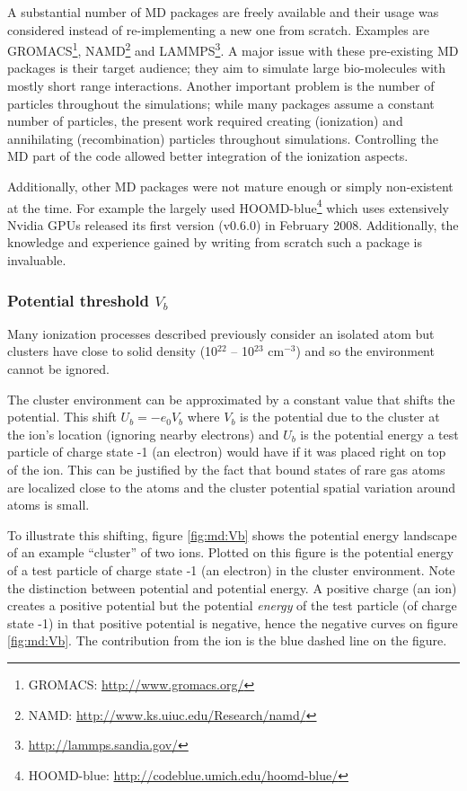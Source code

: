 A substantial number of MD packages are freely available and
their usage was considered instead of re-implementing a new one from scratch.
Examples are GROMACS\footnote{GROMACS:
\url{http://www.gromacs.org/}}, NAMD\footnote{NAMD:
\url{http://www.ks.uiuc.edu/Research/namd/}} and
LAMMPS\footnote{\url{http://lammps.sandia.gov/}}. A major issue with these
pre-existing MD packages is their target audience; they aim to simulate large
bio-molecules with mostly short range interactions. Another important problem
is the number of particles throughout the simulations; while many packages
assume a constant number of particles, the present work required creating
(ionization) and annihilating (recombination) particles throughout simulations.
Controlling the MD part of the code allowed better integration of the
ionization aspects.

Additionally, other MD packages were not mature enough or simply non-existent at the time.
For example the largely used HOOMD-blue\footnote{HOOMD-blue:
\url{http://codeblue.umich.edu/hoomd-blue/}} which uses extensively
Nvidia GPUs released its first version (v0.6.0) in February 2008.
Additionally, the knowledge and experience gained by writing from scratch such
a package is invaluable.






\subsubsection{Potential threshold $V_b$}
\label{section:intro:Vb}

Many ionization processes described previously consider an isolated atom but
clusters have close to solid density (10$^{22}$ -- 10$^{23}$ cm$^{-3}$) and
so the environment cannot be ignored.

The cluster environment can be approximated by a constant value that shifts the
potential\cite{Fennel2007}. This shift $U_b = -e_0 V_b$ where $V_b$ is the
potential due to the cluster at the ion's location (ignoring nearby electrons)
and $U_b$ is the potential energy a test particle of charge state -1 (an electron)
would have if it was placed right on top of the ion. This can be justified by
the fact that bound states of rare gas atoms are localized close to the atoms
and the cluster potential spatial variation around atoms is small.

To illustrate this shifting, figure \ref{fig:md:Vb} shows the potential energy
landscape of an example ``cluster'' of two ions. Plotted on this figure is the
potential energy of a test particle of charge state -1 (an electron) in the
cluster environment. Note the distinction between potential and potential
energy. A positive charge (an ion) creates a positive potential but the
potential \textit{energy} of the test particle (of charge state -1) in that
positive potential is negative, hence the negative curves on figure
\ref{fig:md:Vb}. The contribution from the ion is the blue dashed line on the
figure.



